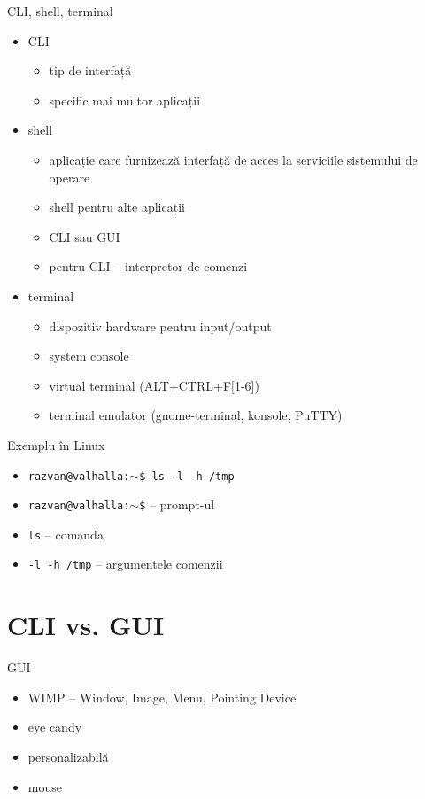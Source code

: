 \documentclass{beamer}
\begin{document}
\begin{frame}{CLI, shell, terminal}
	\begin{itemize}
		\item CLI
			\begin{itemize}
				\item tip de interfață
				\item specific mai multor aplicații
			\end{itemize}
		\item shell
			\begin{itemize}
				\item aplicație care furnizează interfață de acces la serviciile sistemului de operare
				\item shell pentru alte aplicații
				\item CLI sau GUI
				\item pentru CLI -- interpretor de comenzi
			\end{itemize}
		\item terminal
			\begin{itemize}
				\item dispozitiv hardware pentru input/output
				\item system console
				\item virtual terminal (ALT+CTRL+F$[$1-6$]$)
				\item terminal emulator (gnome-terminal, konsole, PuTTY)
			\end{itemize}
	\end{itemize}
\end{frame}

\begin{frame}{Exemplu în Linux}
	\begin{itemize}
		\item \texttt{razvan@valhalla:$\sim$\$ ls -l -h /tmp}
		\item \texttt{razvan@valhalla:$\sim$\$} -- prompt-ul
		\item \texttt{ls} -- comanda
		\item \texttt{-l -h /tmp} -- argumentele comenzii
	\end{itemize}
\end{frame}

\section{CLI vs. GUI}

\begin{frame}{GUI}
	\begin{itemize}
		\item WIMP -- Window, Image, Menu, Pointing Device
		\item eye candy
		\item personalizabilă
		\item mouse
	\end{itemize}
\end{frame}
\end{document}
